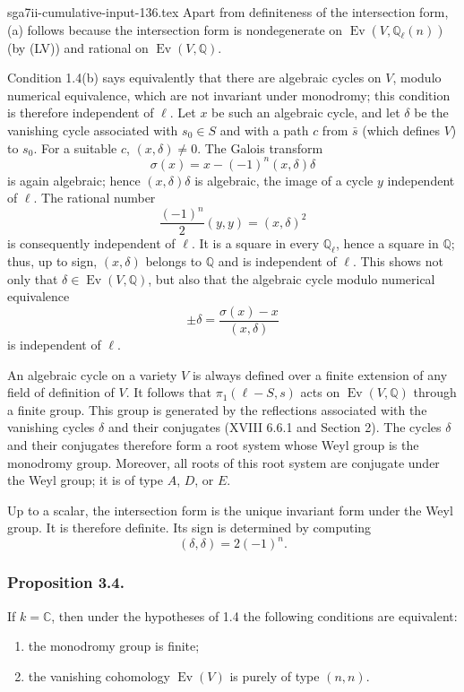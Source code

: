 \begin{filecontents*}{sga7ii-cumulative-input-136.tex}
Apart from definiteness of the intersection form, (a) follows because the
intersection form is nondegenerate on
$\operatorname{Ev}(V,\mathbb Q_\ell(n))$ (by (LV)) and rational on
$\operatorname{Ev}(V,\mathbb Q)$.

Condition 1.4(b) says equivalently that there are algebraic cycles on $V$,
modulo numerical equivalence, which are not invariant under monodromy; this
condition is therefore independent of $\ell$.  Let $x$ be such an algebraic
cycle, and let $\delta$ be the vanishing cycle associated with $s_0\in S$
and with a path $c$ from $\bar s$ (which defines $V$) to $s_0$.  For a
suitable $c$, $(x,\delta)\ne0$.  The Galois transform
\[
  \sigma(x)=x-(-1)^n(x,\delta)\delta
\]
is again algebraic; hence $(x,\delta)\delta$ is algebraic, the image of a
cycle $y$ independent of $\ell$.  The rational number
\[
  \frac{(-1)^n}{2}(y,y)=(x,\delta)^2
\]
is consequently independent of $\ell$.  It is a square in every
$\mathbb Q_\ell$, hence a square in $\mathbb Q$; thus, up to sign,
$(x,\delta)$ belongs to $\mathbb Q$ and is independent of $\ell$.  This
shows not only that $\delta\in\operatorname{Ev}(V,\mathbb Q)$, but also that
the algebraic cycle modulo numerical equivalence
\[
  \pm\delta=\frac{\sigma(x)-x}{(x,\delta)}
\]
is independent of $\ell$.

An algebraic cycle on a variety $V$ is always defined over a finite
extension of any field of definition of $V$.  It follows that
$\pi_1(\ell-S,s)$ acts on $\operatorname{Ev}(V,\mathbb Q)$ through a finite
group.  This group is generated by the reflections associated with the
vanishing cycles $\delta$ and their conjugates (XVIII 6.6.1 and Section 2).
The cycles $\delta$ and their conjugates therefore form a root system whose
Weyl group is the monodromy group.  Moreover, all roots of this root system
are conjugate under the Weyl group; it is of type $A$, $D$, or $E$.

Up to a scalar, the intersection form is the unique invariant form under
the Weyl group.  It is therefore definite.  Its sign is determined by
computing
\[
  (\delta,\delta)=2(-1)^n.
\]

\subsubsection*{Proposition 3.4.}
If $k=\mathbb C$, then under the hypotheses of 1.4 the following conditions
are equivalent:
\begin{enumerate}[label=(\roman*)]
\item the monodromy group is finite;
\item the vanishing cohomology $\operatorname{Ev}(V)$ is purely of type
  $(n,n)$.
\end{enumerate}


\end{filecontents*}
